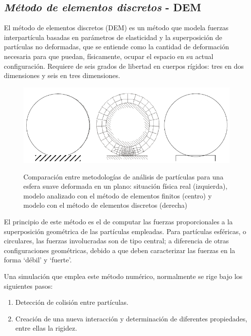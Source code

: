 \begin{center}
	\section{\textit{M\'etodo de elementos discretos} - DEM}
\end{center}

\noindent
\justify

El m\'etodo de elementos discretos (DEM) es un m\'etodo que modela fuerzas interpart\'icula basadas en par\'ametros de elasticidad y la superposici\'on de part\'iculas no deformadas, que se entiende como la cantidad de deformaci\'on necesaria para que puedan, f\'isicamente, ocupar el espacio en su actual configuraci\'on. Requiere de seis grados de libertad en cuerpos r\'igidos: tres en dos dimensiones y seis en tres dimensiones.

\begin{figure}[h!]
	\centering
	\includegraphics[width=\textwidth]{Images/DEM.PNG}
	\label{dem}
	\caption{Comparaci\'on entre metodolog\'ias de an\'alisis de part\'iculas para una esfera suave deformada en un plano: situaci\'on f\'isica real (izquierda), modelo analizado con el m\'etodo de elementos finitos (centro) y modelo con el m\'etodo de elementos discretos (derecha)}
\end{figure}

\noindent
\justify

El principio de este m\'etodo es el de computar las fuerzas proporcionales a la superposici\'on geom\'etrica de las part\'iculas empleadas. Para part\'iculas esf\'ericas, o circulares, las fuerzas involucradas son de tipo central; a diferencia de otras configuraciones geom\'etricas, debido a que deben caracterizar las fuerzas en la forma `d\'ebil' y `fuerte'. 

\noindent
\justify

Una simulaci\'on que emplea este m\'etodo num\'erico, normalmente se rige bajo los siguientes pasos:

\begin{enumerate}
	\item Detecci\'on de colisi\'on entre part\'iculas.
	\item Creaci\'on de una nueva interacci\'on y determinaci\'on de diferentes propiedades, entre ellas la rigidez.
\end{enumerate}

